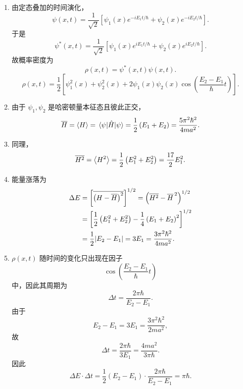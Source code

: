 \documentclass[10pt,a4paper]{article}
\begin{document}
\begin{enumerate}[label=(\alph*)]
  \item 由定态叠加的时间演化，
\[
\psi(x,t)=\frac{1}{\sqrt{2}}\left[\psi_1(x)e^{-iE_1t/\hbar}+\psi_2(x)e^{-iE_2t/\hbar}\right].
\]
于是
\[
\psi^*(x,t)=\frac{1}{\sqrt{2}}\left[\psi_1(x)e^{iE_1t/\hbar}+\psi_2(x)e^{iE_2t/\hbar}\right].
\]
故概率密度为
\[
\rho(x,t)=\psi^*(x,t)\psi(x,t).
\]
\[
\rho(x,t)=\frac{1}{2}\left[\psi_1^2(x)+\psi_2^2(x)+2\psi_1(x)\psi_2(x)\cos\left(\frac{E_2-E_1}{\hbar}t\right)\right].
\]

  \item 由于 \(\psi_1,\psi_2\) 是哈密顿量本征态且彼此正交，
\[
\overline{H}=\ev{H}
=\matrixel{\psi}{\hat{H}}{\psi}
=\frac{1}{2}\left(E_1+E_2\right)
=\frac{5\pi^2\hbar^2}{4ma^2}.
\]

  \item 同理，
\[
\overline{H^2}=\ev{H^2}
=\frac{1}{2}\left(E_1^2+E_2^2\right)
=\frac{17}{2}E_1^2.
\]

  \item 能量涨落为
\begin{align*}
  \Delta E&=\left[\overline{\left(H-\overline{H}\right)^2}\right]^{1/2}
  =\left(\overline{H^2}-\overline{H}^{\,2}\right)^{1/2}\\
  &=\left[
  \frac{1}{2}\left(E_1^2+E_2^2\right)
  -\frac{1}{4}\left(E_1+E_2\right)^2
  \right]^{1/2}\\
  &=\frac{1}{2}\abs{E_2-E_1}=3E_1=\frac{3\pi^2\hbar^2}{4ma^2}.
\end{align*}

  \item \(\rho(x,t)\) 随时间的变化只出现在因子
\[
\cos\left(\frac{E_2-E_1}{\hbar}t\right)
\]
中，因此其周期为
\[
\Delta t=\frac{2\pi\hbar}{E_2-E_1}.
\]
由于
\[
E_2-E_1=3E_1=\frac{3\pi^2\hbar^2}{2ma^2},
\]
故
\[
\Delta t=\frac{2\pi\hbar}{3E_1}
=\frac{4ma^2}{3\pi\hbar}.
\]
因此
\[
\Delta E\cdot \Delta t
=
\frac{1}{2}\left(E_2-E_1\right)\cdot \frac{2\pi\hbar}{E_2-E_1}
=
\pi\hbar.
\]
\end{enumerate}

\end{document}
